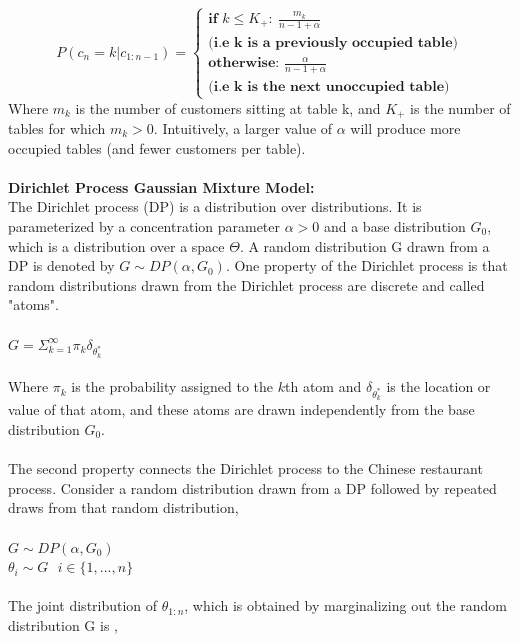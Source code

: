 \documentclass[12pt, a4paper]{paper}
\begin{document}
\[
    P(c_{n} = k|c_{1:n-1}) =
    \left\{
        \begin{array}{ll}
          \textbf{if } k \leq K_{+}: \
          \frac{m_{k}}{n-1+\alpha} \\
          \textbf{(i.e k is a previously occupied table)} \\
          \textbf{otherwise: }
          \frac{\alpha}{n-1+\alpha} \\
          \textbf{(i.e k is the next unoccupied table)}
        \end{array}
    \right.
  \]
Where $m_{k}$ is the number of customers sitting at table k, and $K_{+}$ is the number of tables for which $m_{k} > 0 $. Intuitively, a larger value of $\alpha$ will produce more occupied tables (and fewer customers per table).\\\\
\textbf{Dirichlet Process Gaussian Mixture Model:} \\
The Dirichlet process (DP) is a distribution over distributions. It is parameterized by a concentration parameter $\alpha > 0 $ and a base distribution $G_{0}$, which is a distribution over a space $\Theta$. A random distribution G drawn from a DP is denoted by $G \sim DP(\alpha, G_{0})$. One property of the Dirichlet process \citep{ferguson1973} is that random distributions drawn from the Dirichlet process are discrete and called "atoms". \\\\
$G = \Sigma^{\infty}_{k=1} \pi_{k}\delta_{\theta_{k}^{*}}$ \\\\
Where $\pi_{k}$ is the probability assigned to the $k$th atom and $\delta_{\theta_{k}^{*}}$ is the location or value of that atom, and these atoms are drawn independently from the base distribution $G_{0}$. \\\\
The second property connects the Dirichlet process to the Chinese restaurant process. Consider a random distribution drawn from a DP followed by repeated draws from that random distribution, \\\\
$G \sim DP(\alpha, G_{0})$ \\
$\theta_{i} \sim G \ \ \ i \in \{1,...,n\}$ \\\\
The joint distribution of $\theta_{1:n}$, which is
obtained by marginalizing out the random distribution G is , \\\\
\end{document}
